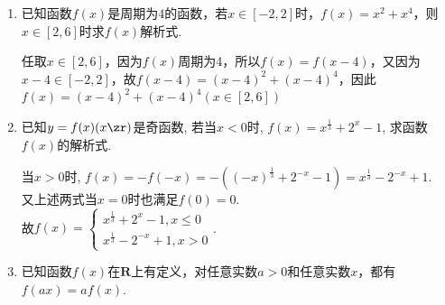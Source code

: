 \begin{enumerate}
\begin{jieda}
\begin{enumerate}[1.]
        综上, 8是$f(x)$的一个周期.
        \item $f(2020)=f(4)=-\sqrt{3}$. 
        \end{enumerate}
        \end{jieda}
    \begin{vspace_}
    \vsp[5]
    \end{vspace_}
    \item 已知函数$f(x)$是周期为$4$的函数，若$x \in [-2, 2]$时，$f(x) = x^2 + x^4$，则$x \in [2, 6]$时求$f(x)$解析式.
    \begin{jieda}
        任取$x \in [2, 6]$，因为$f(x)$周期为4，所以$f(x) = f(x - 4)$，又因为$x - 4 \in [-2, 2]$，故$f(x-4) = (x-4)^2 + (x-4)^4$，因此$f(x) = (x-4)^2 + (x-4)^4 (x \in [2, 6])$ 
    \end{jieda}
    \begin{vspace_}
    \vsp[5]
    \end{vspace_}
    \item 已知$y=f(x)(x\zr)$是奇函数, 若当$x<0$时, $f(x)=x^{\frac{1}{3}}+2^x-1$, 求函数$f(x)$的解析式.
    \begin{jieda}
    当$x>0$时, $f(x)=-f(-x)=-((-x)^{\frac{1}{3}}+2^{-x}-1)=x^{\frac{1}{3}}-2^{-x}+1$. \\
    又上述两式当$x=0$时也满足$f(0)=0$.  \\
    故$f(x) = \begin{cases}
    x^{\frac{1}{3}}+2^x-1, x\leq 0\\
    x^{\frac{1}{3}}-2^{-x}+1, x>0
    \end{cases}$. 
    \end{jieda}
    \begin{vspace_}
    \vsp[5]
    \end{vspace_}
    \item 已知函数$f(x)$在$\mathbf{R}$上有定义，对任意实数$a>0$和任意实数$x$，都有$f(ax) = af(x)$.

\end{enumerate}
